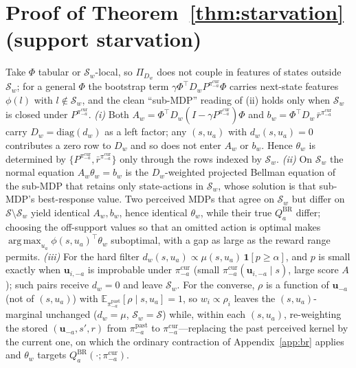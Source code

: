 \documentclass[sigconf]{aamas}
\newcommand{\uma}{\mathbf{u}_{-a}}
\newcommand{\umai}{\mathbf{u}_{i,-a}}
\newcommand{\picur}{\pi^{\mathrm{cur}}_{-a}}
\newcommand{\pipast}{\pi^{\mathrm{past}}_{-a}}
\newcommand{\Qbr}{Q^{\mathrm{BR}}_{a}}
\newcommand{\indic}[1]{\mathbf{1}\!\left[#1\right]}
\DeclareMathOperator*{\argmax}{arg\,max}
\newcommand{\Dw}{D_{w}}
\newcommand{\dw}{d_{w}}
\begin{document}
\section{Proof of Theorem~\ref{thm:starvation} (support starvation)}
\label{app:starvation}
Take $\Phi$ tabular or $\mathcal{S}_w$-local, so $\Pi_{\Dw}$ does not couple in
features of states outside $\mathcal{S}_w$; for a general $\Phi$ the bootstrap term
$\gamma\Phi^\top\Dw P^{\picur}\Phi$ carries next-state features $\phi(l)$ with
$l\notin\mathcal{S}_w$, and the clean ``sub-MDP'' reading of (ii) holds only when
$\mathcal{S}_w$ is closed under $P^{\picur}$.
\emph{(i)} Both $A_w=\Phi^\top\Dw(I-\gamma P^{\picur})\Phi$ and
$b_w=\Phi^\top\Dw\,\bar r^{\picur}$ carry $\Dw=\mathrm{diag}(\dw)$ as a left
factor; any $(s,u_a)$ with $\dw(s,u_a)=0$ contributes a zero row to $\Dw$ and so
does not enter $A_w$ or $b_w$. Hence $\theta_w$ is determined by
$\{P^{\picur},\bar r^{\picur}\}$ only through the rows indexed by $\mathcal{S}_w$.
\emph{(ii)} On $\mathcal{S}_w$ the normal equation $A_w\theta_w=b_w$ is the
$\Dw$-weighted projected Bellman equation of the sub-MDP that retains only
state-actions in $\mathcal{S}_w$, whose solution is that sub-MDP's best-response
value. Two perceived MDPs that agree on $\mathcal{S}_w$ but differ on
$\mathcal{S}\setminus\mathcal{S}_w$ yield identical $A_w,b_w$, hence identical
$\theta_w$, while their true $\Qbr$ differ; choosing the off-support values so that
an omitted action is optimal makes $\argmax_{u_a}\phi(s,u_a)^\top\theta_w$
suboptimal, with a gap as large as the reward range permits.
\emph{(iii)} For the hard filter $\dw(s,u_a)\propto\mu(s,u_a)\,\indic{p\ge\alpha}$,
and $p$ is small exactly when $\umai$ is improbable under $\picur$ (small
$\picur(\umai\mid s)$, large score $A$); such pairs receive $\dw=0$ and leave
$\mathcal{S}_w$. For the converse, $\rho$ is a function of $\uma$ (not of
$(s,u_a)$) with $\mathbb{E}_{\pipast}[\rho\mid s,u_a]=1$, so $w_i\propto\rho_i$
leaves the $(s,u_a)$-marginal unchanged ($\dw=\mu$, $\mathcal{S}_w=\mathcal{S}$)
while, within each $(s,u_a)$, re-weighting the stored $(\uma,s',r)$ from $\pipast$
to $\picur$---replacing the past perceived kernel by the current one, on which the
ordinary contraction of Appendix~\ref{app:br} applies and $\theta_w$ targets
$\Qbr(\cdot;\picur)$.
\end{document}

